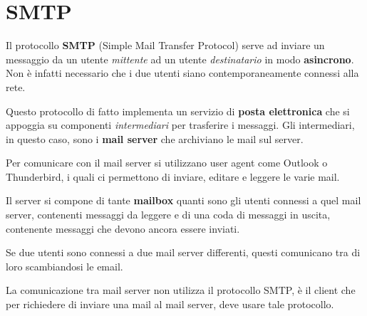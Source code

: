 \section{SMTP}
Il protocollo \textbf{SMTP} (Simple Mail Transfer Protocol) serve ad inviare un messaggio da un
utente \emph{mittente} ad un utente \emph{destinatario} in modo \textbf{asincrono}. Non è infatti
necessario che i due utenti siano contemporaneamente connessi alla rete.

Questo protocollo di fatto implementa un servizio di \textbf{posta elettronica} che si appoggia su
componenti \emph{intermediari} per trasferire i messaggi. Gli intermediari, in questo caso, sono i
\textbf{mail server} che archiviano le mail sul server.

Per comunicare con il mail server si utilizzano user agent come Outlook o Thunderbird, i quali ci
permettono di inviare, editare e leggere le varie mail.

Il server si compone di tante \textbf{mailbox} quanti sono gli utenti connessi a quel mail server,
contenenti messaggi da leggere e di una coda di  messaggi in uscita, contenente messaggi che devono
ancora essere inviati.

Se due utenti sono connessi a due mail server differenti, questi comunicano tra di loro
scambiandosi le email.

La comunicazione tra mail server non utilizza il protocollo SMTP, è il client che per richiedere
di inviare una mail al mail server, deve usare tale protocollo.

